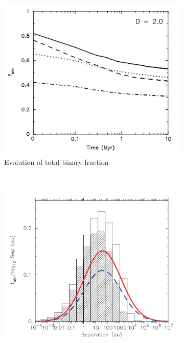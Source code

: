  
\begin{figure}
\center
    \centering
    \begin{subfigure}[b]{0.48\textwidth}
    	\centering
        \includegraphics[width=\textwidth]{Figures/0_binfraction_evolution.png}
        \caption{Evolution of total binary fraction}
        \label{Fig:0_binsim_1}
    \end{subfigure}
    ~~
    \begin{subfigure}[b]{0.48\textwidth}
    	\centering
        \includegraphics[width=0.97\textwidth]{Figures/0_separation_evolution.png}

\end{subfigure}
\end{figure}
